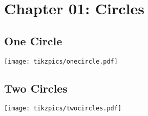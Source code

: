 \documentclass[../main.tex]{subfiles}
\begin{document}
\section{Chapter 01: Circles}

\subsection{One Circle}


\texttt{[image: tikzpics/onecircle.pdf]}


\subsection{Two Circles}

\texttt{[image: tikzpics/twocircles.pdf]}
\end{document}

